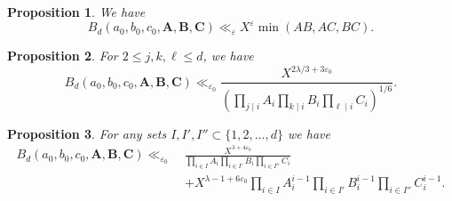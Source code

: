 \documentclass[10pt,a4paper]{amsart}
\newtheorem{prop}{Proposition}
\def\Ab{\mathbf{A}}
\def\Bb{\mathbf{B}}
\def\Cb{\mathbf{C}}
\renewcommand{\le}{\leqslant}
\begin{document}
\begin{prop}\label{prop:triv2}
    We have
    \[B_d(a_0,b_0,c_0,\Ab,\Bb,\Cb) \ll_{\varepsilon} X^{\varepsilon}\min(AB,AC,BC).\]
\end{prop}

\begin{prop}\label{prop:fourierbound}
    For $2 \le j,k,\ell \le d$, we have
    \[B_d(a_0,b_0,c_0,\Ab,\Bb,\Cb) \ll_{\varepsilon_0} \frac{X^{2\lambda/3+3\varepsilon_0}}{\left(\prod_{j \mid i} A_i \prod_{k \mid i} B_i \prod_{\ell \mid i} C_i\right)^{1/6}}.\]
\end{prop}

\begin{prop}\label{prop:geometrybound}
    For any sets $I,I',I'' \subset \{1,2,\dots,d\}$ we have
    \begin{align*}
        B_d(a_0,b_0,c_0,\Ab,\Bb,\Cb) \ll_{\varepsilon_0}~& \frac{X^{\lambda+4\varepsilon_0}}{\prod_{i \in I} A_i \prod_{i \in I'} B_i \prod_{i \in I''} C_i} \\
        &+X^{\lambda-1+6\varepsilon_0} \prod_{i \in I} A_i^{i-1} \prod_{i \in I'} B_i^{i-1} \prod_{i \in I''} C_i^{i-1}.\end{align*}
\end{prop}
\end{document}
